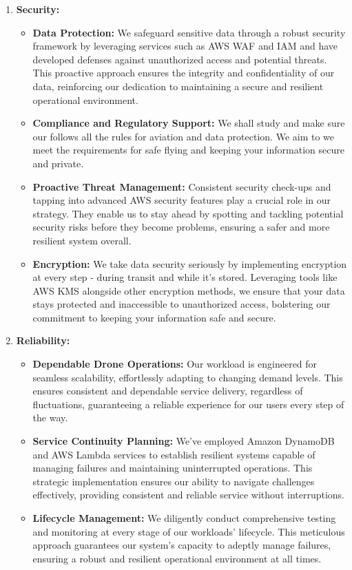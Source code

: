 \documentclass{article}
\begin{document}
\begin{enumerate}
    \item \textbf{Security:} \cite{Security}
    \begin{itemize}
        \item \textbf{Data Protection:} 
        We safeguard sensitive data through a robust security framework by leveraging services such as AWS WAF and IAM and have developed defenses against unauthorized access and potential threats. This proactive approach ensures the integrity and confidentiality of our data, reinforcing our dedication to maintaining a secure and resilient operational environment.
        \item \textbf{Compliance and Regulatory Support:}  We shall study and make sure our follows all the rules for aviation and data protection. We aim to we meet the requirements for safe flying and keeping your information secure and private.
        \item  \textbf{Proactive Threat Management:} 
        Consistent security check-ups and tapping into advanced AWS security features play a crucial role in our strategy. They enable us to stay ahead by spotting and tackling potential security risks before they become problems, ensuring a safer and more resilient system overall.
        \item \textbf{Encryption:} 
        We take data security seriously by implementing encryption at every step - during transit and while it's stored. Leveraging tools like AWS KMS alongside other encryption methods, we ensure that your data stays protected and inaccessible to unauthorized access, bolstering our commitment to keeping your information safe and secure.
    \end{itemize}

    \item \textbf{Reliability:} \cite{Reliability}
    \begin{itemize}
        \item \textbf{Dependable Drone Operations:} 
        Our workload is engineered for seamless scalability, effortlessly adapting to changing demand levels. This ensures consistent and dependable service delivery, regardless of fluctuations, guaranteeing a reliable experience for our users every step of the way.
        \item \textbf{Service Continuity Planning:}
        We've employed Amazon DynamoDB and AWS Lambda services to establish resilient systems capable of managing failures and maintaining uninterrupted operations. This strategic implementation ensures our ability to navigate challenges effectively, providing consistent and reliable service without interruptions.
        \item \textbf{Lifecycle Management:} 
        We diligently conduct comprehensive testing and monitoring at every stage of our workloads' lifecycle. This meticulous approach guarantees our system's capacity to adeptly manage failures, ensuring a robust and resilient operational environment at all times.
    \end{itemize}


\end{enumerate}
\end{document}
